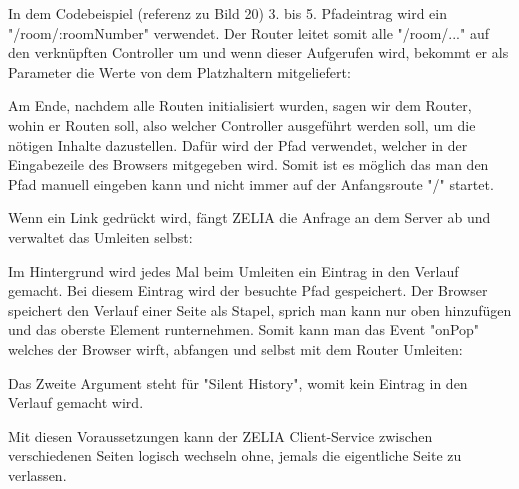 In dem Codebeispiel (referenz zu Bild 20)  3. bis 5. Pfadeintrag wird ein "/room/:roomNumber" verwendet. Der Router leitet somit alle "/room/..." auf den verknüpften Controller um und wenn dieser Aufgerufen wird, bekommt er als Parameter die Werte von dem Platzhaltern mitgeliefert:


Am Ende, nachdem alle Routen initialisiert wurden, sagen wir dem Router, wohin er Routen soll, also welcher Controller ausgeführt werden soll, um die nötigen Inhalte dazustellen. Dafür wird der Pfad verwendet, welcher in der Eingabezeile des Browsers mitgegeben wird. Somit ist es möglich das man den Pfad manuell eingeben kann und nicht immer auf der Anfangsroute "/" startet.

Wenn ein Link gedrückt wird, fängt ZELIA die Anfrage an dem Server ab und verwaltet das Umleiten selbst:


Im  Hintergrund wird jedes Mal beim Umleiten ein Eintrag in den Verlauf gemacht. Bei diesem Eintrag wird der besuchte Pfad gespeichert. Der Browser speichert den Verlauf einer Seite als Stapel, sprich man kann nur oben hinzufügen und das oberste Element runternehmen. Somit kann man das Event "onPop" welches der Browser wirft, abfangen und selbst mit dem Router Umleiten:


Das Zweite Argument steht für "Silent History", womit kein Eintrag in den Verlauf gemacht wird.

Mit diesen Voraussetzungen kann der ZELIA Client-Service zwischen verschiedenen Seiten logisch wechseln ohne, jemals die eigentliche Seite zu verlassen.